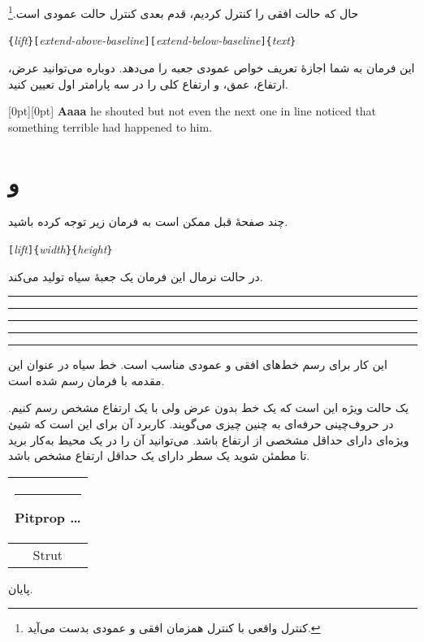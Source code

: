 حال که حالت افقی را کنترل کردیم، قدم بعدی کنترل حالت عمودی است.\footnote{کنترل واقعی با کنترل همزمان افقی و عمودی بدست می‌آید.}


\begin{lscommand}
\verb|{|\emph{lift}\verb|}[|\emph{extend-above-baseline}\verb|][|\emph{extend-below-baseline}\verb|]{|\emph{text}\verb|}|
\end{lscommand}


\noindent این فرمان به شما اجازهٔ تعریف خواص عمودی جعبه را می‌دهد. دوباره می‌توانید  عرض، 
ارتفاع، 
عمق، 
و  ارتفاع کلی  
را در سه پارامتر اول تعیین کنید.


\begin{example}
\raisebox{0pt}[0pt][0pt]{\Large%
\textbf{Aaaa\raisebox{-0.3ex}{a}%
\raisebox{-0.7ex}{aa}%
\raisebox{-1.2ex}{r}%
\raisebox{-2.2ex}{g}%
\raisebox{-4.5ex}{h}}}
he shouted but not even the next
one in line noticed that something
terrible had happened to him.
\end{example}

\section{\texorpdfstring{ و }{فرمان‌های rule و strut}}
\label{sec:rule}

چند صفحهٔ قبل ممکن است به فرمان زیر توجه کرده باشید.


\begin{lscommand}
\verb|[|\emph{lift}\verb|]{|\emph{width}\verb|}{|\emph{height}\verb|}|
\end{lscommand}


\noindent در حالت نرمال این فرمان یک جعبهٔ سیاه تولید می‌کند.


\begin{example}
\rule{3mm}{.1pt}%
\rule[-1mm]{5mm}{1cm}%
\rule{3mm}{.1pt}%
\rule[1mm]{1cm}{5mm}%
\rule{3mm}{.1pt}
\end{example}


\noindent این کار برای رسم خط‌های افقی و عمودی مناسب است. خط سیاه در عنوان این مقدمه با فرمان 
 رسم شده است.

یک حالت ویژه این است که یک خط بدون عرض ولی با یک ارتفاع مشخص رسم کنیم. در حروف‌چینی حرفه‌ای به چنین چیزی  
 می‌گویند. کاربرد آن برای این است که شیئ ویژه‌ای دارای حداقل مشخصی از ارتفاع باشد. می‌توانید آن را در یک محیط  به‌کار برید تا مطمئن شوید یک سطر دارای یک حداقل ارتفاع مشخص باشد.


\begin{example}
\begin{tabular}{|c|}
\hline
\rule{1pt}{4ex}Pitprop \ldots\\
\hline
\rule{0pt}{4ex}Strut\\
\hline
\end{tabular}
\end{example}


\bigskip
{\flushleft پایان.\par}

%

